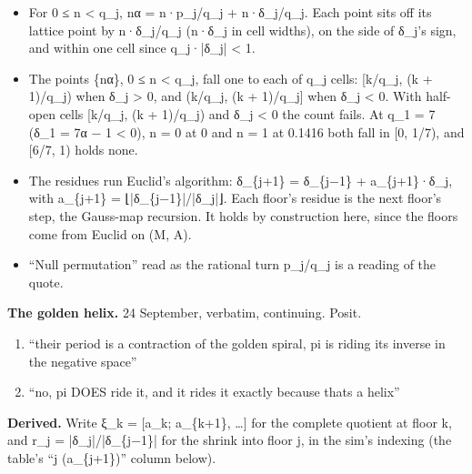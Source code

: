 \begin{itemize}
\begin{itemize}
\item For 0 ≤ n < q\_\allowbreak{}j, nα = n·p\_\allowbreak{}j/q\_\allowbreak{}j + n·δ\_\allowbreak{}j/q\_\allowbreak{}j. Each point sits off its lattice point by n·δ\_\allowbreak{}j/q\_\allowbreak{}j (n·δ\_\allowbreak{}j in cell widths), on the side of δ\_\allowbreak{}j's sign, and within one cell since q\_\allowbreak{}j·|δ\_\allowbreak{}j| < 1.
\item The points \{nα\}, 0 ≤ n < q\_\allowbreak{}j, fall one to each of q\_\allowbreak{}j cells: [k/q\_\allowbreak{}j, (k + 1)/q\_\allowbreak{}j) when δ\_\allowbreak{}j > 0, and (k/q\_\allowbreak{}j, (k + 1)/q\_\allowbreak{}j] when δ\_\allowbreak{}j < 0. With half-open cells [k/q\_\allowbreak{}j, (k + 1)/q\_\allowbreak{}j) and δ\_\allowbreak{}j < 0 the count fails. At q\_\allowbreak{}1 = 7 (δ\_\allowbreak{}1 = 7α − 1 < 0), n = 0 at 0 and n = 1 at 0.1416 both fall in [0, 1/7), and [6/7, 1) holds none.
\item The residues run Euclid's algorithm: δ\_\allowbreak{}\{j+1\} = δ\_\allowbreak{}\{j−1\} + a\_\allowbreak{}\{j+1\}·δ\_\allowbreak{}j, with a\_\allowbreak{}\{j+1\} = ⌊|δ\_\allowbreak{}\{j−1\}|/|δ\_\allowbreak{}j|⌋. Each floor's residue is the next floor's step, the Gauss-map recursion. It holds by construction here, since the floors come from Euclid on (M, A).
\item “Null permutation” read as the rational turn p\_\allowbreak{}j/q\_\allowbreak{}j is a reading of the quote.
\end{itemize}
\end{itemize}

\textbf{The golden helix.} 24 September, verbatim, continuing. Posit.

\begin{enumerate}
\item “their period is a contraction of the golden spiral, pi is riding its inverse in the negative space”
\item “no, pi DOES ride it, and it rides it exactly because thats a helix”
\end{enumerate}

\textbf{Derived.} Write ξ\_\allowbreak{}k = [a\_\allowbreak{}k; a\_\allowbreak{}\{k+1\}, …] for the complete quotient at floor k, and r\_\allowbreak{}j = |δ\_\allowbreak{}j|/|δ\_\allowbreak{}\{j−1\}| for the shrink into floor j, in the sim's indexing (the table's “j (a\_\allowbreak{}\{j+1\})” column below).

